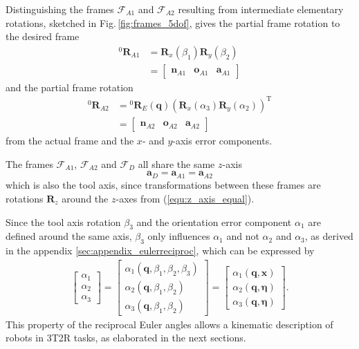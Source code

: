 \documentclass[twocolumn,10pt]{IFTOMM}
\newcommand{\bm}[1]{\boldsymbol{#1}}
\newcommand{\vek}[3]{\boldsymbol{#1}^{#2}_{#3}}
\newcommand{\rotmat}[2]{{{ }^{#1}\boldsymbol{R}}_{#2}}
\newcommand{\transp}[0]{{\mathrm{T}}}
\newcommand{\ks}[1]{{\mathcal{F}}_{#1}}
\begin{document}
Distinguishing the frames $\ks{A1}$ and $\ks{A2}$ resulting from intermediate elementary rotations, sketched in Fig.\,\ref{fig:frames_5dof}, gives the partial frame rotation to the desired frame
%
\begin{align}
\rotmat{0}{A1} 
&= 
\bm{R}_x(\beta_1) \bm{R}_y(\beta_2)\\
&=
\begin{bmatrix}
\vek{n}{}{A1} & \vek{o}{}{A1} & \vek{a}{}{A1}
\end{bmatrix} \nonumber
\end{align}
%
and the partial frame rotation
%
\begin{align}
\rotmat{0}{A2} 
&= 
\rotmat{0}{E}(\bm{q})
\left(\bm{R}_x(\alpha_3) \bm{R}_y(\alpha_2)\right)^\transp \\ 
&=
\begin{bmatrix}
\vek{n}{}{A2} & \vek{o}{}{A2} & \vek{a}{}{A2}
\end{bmatrix}\nonumber
\end{align}
%
from the actual frame and the $x$- and $y$-axis error components.

The frames $\ks{A1}$, $\ks{A2}$ and $\ks{D}$ all share the same $z$-axis
%
\begin{equation}
\vek{a}{}{D}
=
\vek{a}{}{A1}
=
\vek{a}{}{A2}
\label{equ:z_axis_equal}
\end{equation}
%
which is also the tool axis, since transformations between these frames are rotations $\bm{R}_z$ around the $z$-axes from (\ref{equ:z_axis_equal}).

Since the tool axis rotation $\beta_3$ and the orientation error component $\alpha_1$ are defined around the same axis, $\beta_3$ only influences $\alpha_1$ and not $\alpha_2$ and $\alpha_3$, as derived in the appendix \ref{sec:appendix_eulerreciproc}, which can be expressed by
%
\begin{align}
\begin{bmatrix}
\alpha_1 \\
\alpha_2 \\
\alpha_3
\end{bmatrix}
=
\begin{bmatrix}
\alpha_1(\bm{q},\beta_1,\beta_2,\beta_3) \\
\alpha_2(\bm{q},\beta_1,\beta_2) \\
\alpha_3(\bm{q},\beta_1,\beta_2)
\end{bmatrix}
=
\begin{bmatrix}
\alpha_1(\bm{q},\bm{x}) \\
\alpha_2(\bm{q},\bm{\eta}) \\
\alpha_3(\bm{q},\bm{\eta}) 
\end{bmatrix}
\label{equ:alpha_dep_beta}.
\end{align}
%
This property of the reciprocal Euler angles allows a kinematic description of robots in 3T2R tasks, as elaborated in the next sections.
\end{document}
